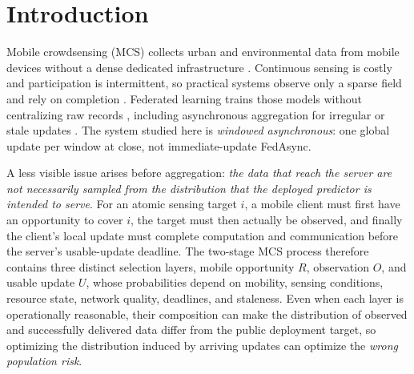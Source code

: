 \documentclass[letterpaper,journal]{IEEEtran}
\begin{document}
\section{Introduction}
\label{sec:introduction}

Mobile crowdsensing (MCS) collects urban and environmental data from mobile
devices without a dense dedicated infrastructure
\cite{ganti2011mobile,guo2015mobile,ma2014opportunities}.
Continuous sensing is costly and participation is intermittent, so practical
systems observe only a sparse field and rely on completion
\cite{wang2023outlier,li2024robust,wang2023transformer,wang2024fewshot,wang2025evolutionary,xu2025rethinking,liu2026pyramid,zhang2026mapt}.
Federated learning trains those models without centralizing raw records
\cite{mcmahan2017communication,yang2019federated,kairouz2021advances,li2020federated},
including asynchronous aggregation for irregular or stale updates
\cite{wang2026federated,xie2019asynchronous,liu2023adaptive,sun2024staleness}.
The system studied here is \emph{windowed asynchronous}: one global update per
window at close, not immediate-update FedAsync.

A less visible issue arises before aggregation: \emph{the data that reach the
server are not necessarily sampled from the distribution that the deployed
predictor is intended to serve}.  For an atomic sensing target $i$, a mobile
client must first have an opportunity to cover $i$, the target must then actually
be observed, and finally the client's local update must complete computation and
communication before the server's usable-update deadline.  The two-stage MCS
process therefore contains three distinct selection layers, mobile opportunity
$R$, observation $O$, and usable update $U$, whose probabilities depend on
mobility, sensing conditions, resource state, network quality, deadlines, and
staleness.  Even when each layer is operationally reasonable, their composition
can make the distribution of observed and successfully delivered data differ
from the public deployment target, so optimizing the distribution induced by
arriving updates can optimize the \emph{wrong population risk}.
\end{document}
